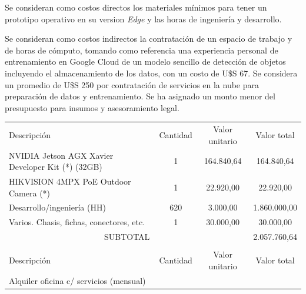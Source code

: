 \documentclass[11pt]{charter}
\begin{document}
Se consideran como costos directos los materiales mínimos para tener un prototipo operativo en su version { \em Edge } y las horas de ingeniería y desarrollo.

Se consideran como costos indirectos la contratación de un espacio de trabajo y de horas de cómputo, tomando como referencia una experiencia personal de entrenamiento en Google Cloud de un modelo sencillo de detección de objetos incluyendo el almacenamiento de los datos, con un costo de U\$S 67. Se considera un promedio de U\$S 250 por contratación de servicios en la nube para preparación de datos y entrenamiento. Se ha asignado un monto menor del presupuesto para insumos y asesoramiento legal.

\begin{table}[htpb]
\centering
\begin{tabularx}{\linewidth}{@{}|X|c|r|r|@{}}
\hline
\rowcolor[HTML]{C0C0C0} 
\multicolumn{4}{|c|}{\cellcolor[HTML]{C0C0C0}COSTOS DIRECTOS} \\ \hline
\rowcolor[HTML]{C0C0C0} 
Descripción &
  \multicolumn{1}{c|}{\cellcolor[HTML]{C0C0C0}Cantidad} &
  \multicolumn{1}{c|}{\cellcolor[HTML]{C0C0C0}Valor unitario} &
  \multicolumn{1}{c|}{\cellcolor[HTML]{C0C0C0}Valor total} \\ \hline
NVIDIA Jetson AGX Xavier Developer Kit (*) (32GB) &
  \multicolumn{1}{c|}{1} &
  \multicolumn{1}{c|}{164.840,64	} &
  \multicolumn{1}{c|}{164.840,64	} \\ \hline
HIKVISION 4MPX PoE Outdoor Camera (*) &
  \multicolumn{1}{c|}{1} &
  \multicolumn{1}{c|}{22.920,00} &
  \multicolumn{1}{c|}{22.920,00} \\ \hline
Desarrollo/ingeniería (HH) &  
  \multicolumn{1}{c|}{620} &
  \multicolumn{1}{c|}{3.000,00} &
  \multicolumn{1}{c|}{1.860.000,00} \\ \hline
Varios. Chasis, fichas, conectores, etc. &  
  \multicolumn{1}{c|}{1} &
  \multicolumn{1}{c|}{30.000,00} &
  \multicolumn{1}{c|}{30.000,00} \\ \hline  
\multicolumn{3}{|c|}{SUBTOTAL} &
  \multicolumn{1}{c|}{2.057.760,64} \\ \hline
\rowcolor[HTML]{C0C0C0} 
\multicolumn{4}{|c|}{\cellcolor[HTML]{C0C0C0}COSTOS INDIRECTOS} \\ \hline
\rowcolor[HTML]{C0C0C0} 
Descripción &
  \multicolumn{1}{c|}{\cellcolor[HTML]{C0C0C0}Cantidad} &
  \multicolumn{1}{c|}{\cellcolor[HTML]{C0C0C0}Valor unitario} &
  \multicolumn{1}{c|}{\cellcolor[HTML]{C0C0C0}Valor total} \\ \hline
\multicolumn{1}{|l|}{Alquiler oficina c/ servicios (mensual)	} &

\end{tabularx}
\end{table}
\end{document}
